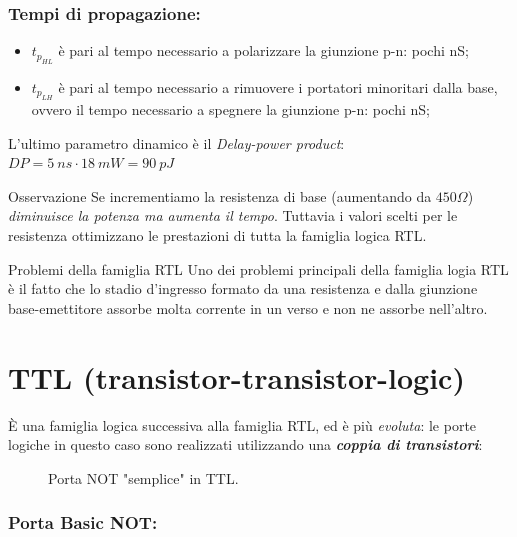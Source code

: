\documentclass[
]{book}
\providecommand{\tightlist}{%
  \setlength{\itemsep}{0pt}\setlength{\parskip}{0pt}}
\begin{document}
\subsubsection{Tempi di propagazione:}\label{tempi-di-propagazione}

\begin{itemize}
\tightlist
\item
  \(t_{p_{HL}}\) è pari al tempo necessario a polarizzare la giunzione
  p-n: pochi nS;
\item
  \(t_{p_{LH}}\) è pari al tempo necessario a rimuovere i portatori
  minoritari dalla base, ovvero il tempo necessario a spegnere la
  giunzione p-n: pochi nS;
\end{itemize}

L'ultimo parametro dinamico è il \emph{Delay-power product}:
\(DP=5\:ns\cdot 18\:mW=90\:pJ\)

\begin{redbox}{Osservazione}
Se incrementiamo la resistenza di base (aumentando da $450\Omega$) \emph{diminuisce la potenza ma aumenta il tempo}.\newline
Tuttavia i valori scelti per le resistenza ottimizzano le prestazioni di tutta la famiglia logica RTL.
\end{redbox}
\begin{orangebox}{Problemi della famiglia RTL}
Uno dei problemi principali della famiglia logia RTL è il fatto che lo stadio d'ingresso formato da una resistenza e dalla giunzione base-emettitore assorbe molta corrente in un verso e non ne assorbe nell'altro.
\end{orangebox}

\section{TTL
(transistor-transistor-logic)}\label{ttl-transistor-transistor-logic}

È una famiglia logica successiva alla famiglia RTL, ed è più
\emph{evoluta}: le porte logiche in questo caso sono realizzati
utilizzando una \textbf{\emph{coppia di transistori}}:

\begin{figure}[H]
    \centering
    \resizebox{0.4\textwidth}{!}{}
    \caption{Porta NOT "semplice" in TTL.}
\end{figure}

\subsubsection{\texorpdfstring{Porta \textbf{Basic
NOT}:}{Porta Basic NOT:}}\label{porta-basic-not}
\end{document}
